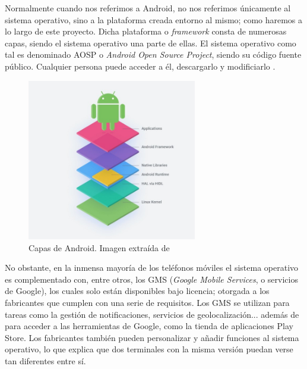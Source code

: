             Normalmente cuando nos referimos a Android, no nos referimos únicamente al sistema operativo, sino a la
            plataforma creada entorno al mismo; como haremos a lo largo de este proyecto. Dicha plataforma o 
            \textit{framework} consta de numerosas capas, siendo el sistema operativo una parte de ellas. El sistema 
            operativo como tal es denominado AOSP o \textit{Android Open Source Project}, siendo su código fuente 
            público. Cualquier persona puede acceder a él, descargarlo y modificiarlo \cite{collado_que_2022}.

            \begin{figure}[h]
                \centering
                \includegraphics[width=0.66\textwidth]{figures/Android capas.jpg}
                \caption[Capas de Android.]
                {Capas de Android. Imagen extraída de \cite{perez_aosp_2019}}
                \label{figure:android:capas}
            \end{figure}

            No obstante, en la inmensa mayoría de los teléfonos móviles el sistema operativo es complementado con,
            entre otros, los GMS (\textit{Google Mobile Services}, o servicios de Google), los cuales solo están 
            disponibles bajo licencia; otorgada a los fabricantes que cumplen con una serie de requisitos. Los GMS 
            se utilizan para tareas como la gestión de notificaciones, servicios de geolocalización... además de para 
            acceder a las herramientas de Google, como la tienda de aplicaciones Play Store. Los fabricantes también 
            pueden personalizar y añadir funciones al sistema operativo, lo que explica que dos terminales con la misma 
            versión puedan verse tan diferentes entre sí. 
            

